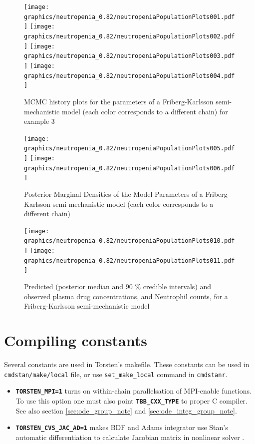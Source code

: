 \documentclass[10pt, reqno, oneside]{amsbook}
\numberwithin{equation}{chapter}
\numberwithin{figure}{chapter}
\numberwithin{table}{chapter}
\theoremstyle{remark}
\begin{document}
\begin{figure}[htbp]
\texttt{[image: graphics/neutropenia\_0.82/neutropeniaPopulationPlots001.pdf]}
\texttt{[image: graphics/neutropenia\_0.82/neutropeniaPopulationPlots002.pdf]}
\texttt{[image: graphics/neutropenia\_0.82/neutropeniaPopulationPlots003.pdf]}
\texttt{[image: graphics/neutropenia\_0.82/neutropeniaPopulationPlots004.pdf]}
\caption{{MCMC history plots for the parameters of a Friberg-Karlsson semi-mechanistic model (each color corresponds to a different chain) for example 3}}
\label{FKMCMC}
\end{figure}

\begin{figure}[htbp]
\texttt{[image: graphics/neutropenia\_0.82/neutropeniaPopulationPlots005.pdf]}
\texttt{[image: graphics/neutropenia\_0.82/neutropeniaPopulationPlots006.pdf]}
\caption{{Posterior Marginal Densities of the Model Parameters of a Friberg-Karlsson semi-mechanistic model (each color corresponds to a different chain)}}
\label{FKDens}
\end{figure}

\begin{figure}[htbp]
\texttt{[image: graphics/neutropenia\_0.82/neutropeniaPopulationPlots010.pdf]}
\texttt{[image: graphics/neutropenia\_0.82/neutropeniaPopulationPlots011.pdf]}
\caption{{Predicted (posterior median and 90 \% credible intervals) and observed plasma drug concentrations, and Neutrophil counts, for a Friberg-Karlsson semi-mechanistic model}}
\label{FKPredictions}
\end{figure}

\appendix
\chapter*{Compiling constants}
\label{sec:orgbe54957}
Several constants are used in Torsten's makefile. These constants can
be used in \texttt{cmdstan/make/local} file, or use \texttt{set\_make\_local} command
in \texttt{cmdstanr}.
\begin{itemize}
\item {\small \color{MRGGreen} \texttt{\textbf{TORSTEN\_MPI=1}}} turns on within-chain parallelsation of MPI-enable
functions. To use this option one must also point
{\small \color{MRGGreen} \texttt{\textbf{TBB\_CXX\_TYPE}}} to proper C compiler. See also section \ref{sec:ode_group_note} and \ref{sec:ode_integ_group_note}.
\item {\small \color{MRGGreen} \texttt{\textbf{TORSTEN\_CVS\_JAC\_AD=1}}} makes BDF and Adams
integrator use Stan's automatic differentiation to calculate
Jacobian matrix in nonlinear solver \cite{hindmarsh_cvodes_2020}.
\end{itemize}

\printindex

\backmatter



\end{document}
